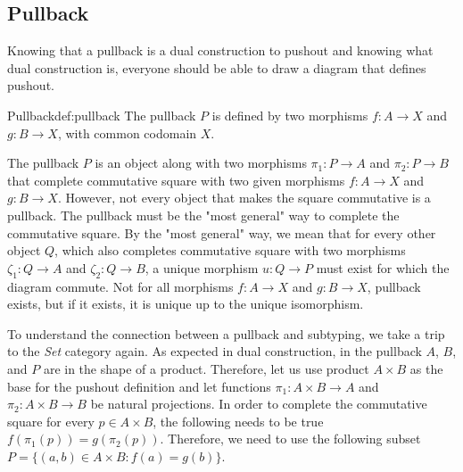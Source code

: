 \subsection{Pullback}
Knowing that a pullback is a dual construction to pushout and knowing what dual construction is, everyone should be able to draw a diagram that defines pushout.
\begin{defi}{Pullback}{def:pullback}
The pullback \cite{CategoryTheory} $P$ is defined by two morphisms $f: A \rightarrow X$ and $g: B \rightarrow X$, with common codomain $X$.
\begin{center}
\end{center}
The pullback $P$ is an object along with two morphisms $\pi_1: P \rightarrow A$ and $\pi_2: P \rightarrow B$ that complete commutative square with two given morphisms $f: A \rightarrow X$ and $g: B \rightarrow X$. However, not every object that makes the square commutative is a pullback. The pullback must be the "most general" way to complete the commutative square. By the "most general" way, we mean that for every other \pagebreak 
object $Q$, which also completes commutative square with two morphisms $\zeta_1: Q \rightarrow A$ and $\zeta_2: Q \rightarrow B$, a unique morphism $u: Q \rightarrow P$ must exist for which the diagram commute. Not for all morphisms $f: A \rightarrow X$ and $g: B \rightarrow X$, pullback exists, but if it exists, it is unique up to the unique isomorphism.
\end{defi}
To understand the connection between a pullback and subtyping, we take a trip to the \emph{Set} category again. As expected in dual construction, in the pullback $A$, $B$, and $P$ are in the shape of a product. Therefore, let us use product $A \times B$ as the base for the pushout definition and let functions $\pi_1: A \times B \rightarrow A$ and $\pi_2: A \times B \rightarrow B$ be natural projections. In order to complete the commutative square for every $p \in A \times B$, the following needs to be true $f (\pi_1 (p)) = g (\pi_2(p))$. Therefore, we need to use the following subset $P = \{(a, b) \in A \times B : f(a) = g(b)\}$. 
